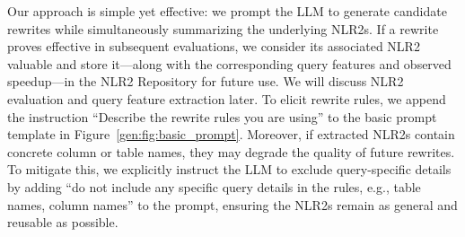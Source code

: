  Our approach is simple yet effective: we prompt the LLM to generate candidate rewrites while simultaneously summarizing the underlying NLR2s. If a rewrite proves effective in subsequent evaluations, we consider its associated NLR2 valuable and store it—along with the corresponding query features and observed speedup—in the NLR2 Repository for future use. We will discuss NLR2 evaluation and query feature extraction  later. To elicit rewrite rules, we append the instruction ``Describe the rewrite rules you are using'' to the basic prompt template in Figure~\ref{gen:fig:basic_prompt}. Moreover, if extracted NLR2s contain concrete column or table names, they may degrade the quality of future rewrites. To mitigate this, we explicitly instruct the LLM to exclude query-specific details by adding ``do not include any specific query details in the rules, e.g., table names, column names'' to the prompt, ensuring the NLR2s remain as general and reusable as possible.












